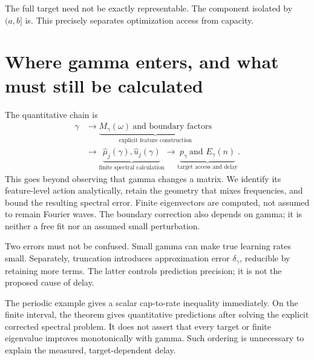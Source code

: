 \documentclass[11pt]{article}
\theoremstyle{definition}
\begin{document}
The full target need not be exactly representable. The component isolated
by $(a,b]$ is. This precisely separates optimization access from capacity.

\section{Where gamma enters, and what must still be calculated}
The quantitative chain is
\[
\begin{aligned}
\gamma
&\longrightarrow\underbrace{M_\gamma(\omega)\ \text{and boundary factors}}
_{\text{explicit feature construction}}\\
&\longrightarrow\underbrace{\widehat\mu_j(\gamma),\widehat u_j(\gamma)}
_{\text{finite spectral calculation}}
\longrightarrow\underbrace{p_\gamma\ \text{and }E_\gamma(n)}
_{\text{target access and delay}}.
\end{aligned}
\]
This goes beyond observing that gamma changes a matrix. We identify its
feature-level action analytically, retain the geometry that mixes frequencies,
and bound the resulting spectral error. Finite eigenvectors are computed,
not assumed to remain Fourier waves. The boundary correction also depends
on gamma; it is neither a free fit nor an assumed small perturbation.

Two errors must not be confused. Small gamma can make true learning rates
small. Separately, truncation introduces approximation error $\delta_\gamma$,
reducible by retaining more terms. The latter controls prediction precision;
it is not the proposed cause of delay.

The periodic example gives a scalar cap-to-rate inequality immediately.
On the finite interval, the theorem gives quantitative predictions after
solving the explicit corrected spectral problem. It does not assert that
every target or finite eigenvalue improves monotonically with gamma. Such
ordering is unnecessary to explain the measured, target-dependent delay.
\end{document}
